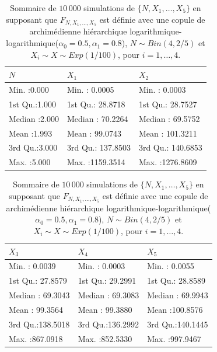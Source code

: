 \documentclass{article}
\begin{document}
		\begin{table}[H]
			\centering
			\begin{tabular}{lll}
				\hline
				      $N$ &       $X_1$ &       $X_2$  \\ 
				\hline
				 Min.   :0.000   & Min.   :   0.0005   & Min.   :   0.0003    \\ 
				 1st Qu.:1.000   & 1st Qu.:  28.8718   & 1st Qu.:  28.7527      \\ 
				 Median :2.000   & Median :  70.2264   & Median :  69.5752     \\ 
				 Mean   :1.993   & Mean   :  99.0743   & Mean   : 101.3211      \\ 
				 3rd Qu.:3.000   & 3rd Qu.: 137.8503   & 3rd Qu.: 140.6853     \\ 
				 Max.   :5.000   & Max.   :1159.3514   & Max.   :1276.8609     \\ 
				\hline
			\end{tabular}
			\begin{tabular}{lll}
				\hline
				       $X_3$ &      $X_4$&       $X_5$ \\ 
				\hline
				 Min.   :  0.0039   & Min.   :  0.0003   & Min.   :  0.0055   \\ 
				 1st Qu.: 27.8579   & 1st Qu.: 29.2991   & 1st Qu.: 28.8589   \\ 
				 Median : 69.3043   & Median : 69.3083   & Median : 69.9943   \\ 
				 Mean   : 99.3564   & Mean   : 99.3880   & Mean   :100.8576   \\ 
				 3rd Qu.:138.5018   & 3rd Qu.:136.2992   & 3rd Qu.:140.1445   \\ 
				 Max.   :867.0918   & Max.   :852.5330   & Max.   :997.9467   \\ 
				\hline
			\end{tabular}
		\caption[Sommaire des données simulées pour le scénario \ref{scenario_log_log}]{Sommaire de $10\,000$ simulations de $\{N, X_1, \dots, X_5\}$ en supposant que $F_{N,X_1,\dots, X_5}$ est définie avec une copule de archimédienne hiérarchique logarithmique-logarithmique($\alpha_0=0.5, \alpha_1=0.8$), $N \sim Bin(4, 2/5)$ et $X_i \sim X \sim Exp(1/100)$, pour $i=1,\dots, 4$.}
		\label{tbl_sommaire_log_log}
		\end{table}
	
\end{document}

